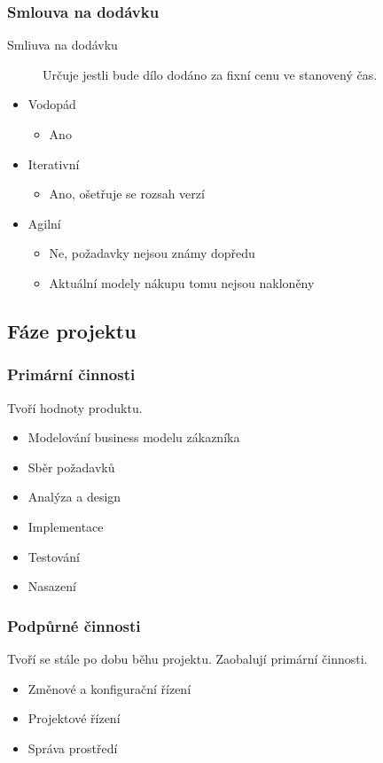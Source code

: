                 \subsubsection{Smlouva na dodávku}
                  \begin{description}
                    \item[Smliuva na dodávku] Určuje jestli bude dílo dodáno za fixní cenu ve stanovený čas.
                  \end{description}

                  \begin{itemize}
                    \item Vodopád
                      \begin{itemize}
                        \item Ano
                      \end{itemize}
                    \item Iterativní
                      \begin{itemize}
                        \item Ano, ošetřuje se rozsah verzí
                      \end{itemize}
                    \item Agilní
                      \begin{itemize}
                        \item Ne, požadavky nejsou známy dopředu
                        \item Aktuální modely nákupu tomu nejsou nakloněny
                      \end{itemize}
                  \end{itemize}

    \subsection{Fáze projektu}
      \subsubsection{Primární činnosti}
        Tvoří hodnoty produktu.

        \begin{itemize}
          \item Modelování business modelu zákazníka
          \item Sběr požadavků
          \item Analýza a design
          \item Implementace
          \item Testování
          \item Nasazení
        \end{itemize}

      \subsubsection{Podpůrné činnosti}
        Tvoří se stále po dobu běhu projektu. Zaobalují primární činnosti.

        \begin{itemize}
          \item Změnové a konfigurační řízení
          \item Projektové řízení
          \item Správa prostředí
        \end{itemize}
